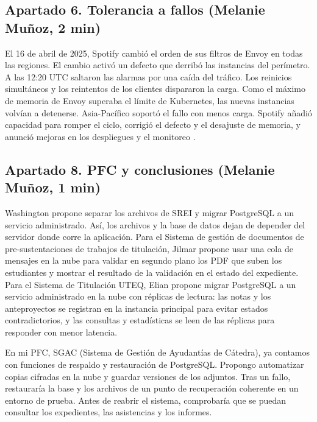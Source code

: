 \subsection*{Apartado 6. Tolerancia a fallos (Melanie Muñoz, 2 min)}

El 16 de abril de 2025, Spotify cambió el orden de sus filtros de Envoy en
todas las regiones. El cambio activó un defecto que derribó las instancias
del perímetro. A las 12:20 UTC saltaron las alarmas por una caída del
tráfico. Los reinicios simultáneos y los reintentos de los clientes
dispararon la carga. Como el máximo de memoria de Envoy superaba el límite
de Kubernetes, las nuevas instancias volvían a detenerse. Asia-Pacífico
soportó el fallo con menos carga. Spotify añadió capacidad para romper el
ciclo, corrigió el defecto y el desajuste de memoria, y anunció mejoras en
los despliegues y el monitoreo \cite{spotifyIncident2025}.

\subsection*{Apartado 8. PFC y conclusiones (Melanie Muñoz, 1 min)}

Washington propone separar los archivos de SREI y migrar PostgreSQL a un
servicio administrado. Así, los archivos y la base de datos dejan de depender
del servidor donde corre la aplicación. Para el Sistema de gestión de
documentos de pre-sustentaciones de trabajos de titulación, Jilmar propone
usar una cola de mensajes en la nube para validar en segundo plano los PDF
que suben los estudiantes y mostrar el resultado de la validación en el
estado del expediente. Para el Sistema de Titulación UTEQ, Elian propone
migrar PostgreSQL a un servicio administrado en la nube con réplicas de
lectura: las notas y los anteproyectos se registran en la instancia
principal para evitar estados contradictorios, y las consultas y
estadísticas se leen de las réplicas para responder con menor latencia.

En mi PFC, SGAC (Sistema de Gestión de Ayudantías de Cátedra), ya contamos
con funciones de respaldo y restauración de PostgreSQL. Propongo automatizar
copias cifradas en la nube y guardar versiones de los adjuntos. Tras un
fallo, restauraría la base y los archivos de un punto de recuperación
coherente en un entorno de prueba. Antes de reabrir el sistema, comprobaría
que se puedan consultar los expedientes, las asistencias y los informes.

